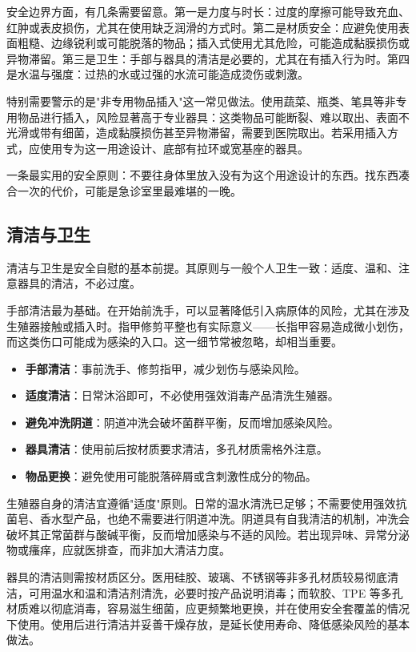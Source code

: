 \documentclass[12pt,UTF8]{ctexbook}
\newcommand{\keyword}[1]{\textbf{#1}}
\begin{document}
安全边界方面，有几条需要留意。第一是力度与时长：过度的摩擦可能导致充血、红肿或表皮损伤，尤其在使用缺乏润滑的方式时。第二是材质安全：应避免使用表面粗糙、边缘锐利或可能脱落的物品；插入式使用尤其危险，可能造成黏膜损伤或异物滞留。第三是卫生：手部与器具的清洁是必要的，尤其在有插入行为时。第四是水温与强度：过热的水或过强的水流可能造成烫伤或刺激。

特别需要警示的是"非专用物品插入"这一常见做法。使用蔬菜、瓶类、笔具等非专用物品进行插入，风险显著高于专业器具：这类物品可能断裂、难以取出、表面不光滑或带有细菌，造成黏膜损伤甚至异物滞留，需要到医院取出。若采用插入方式，应使用专为这一用途设计、底部有拉环或宽基座的器具。

\begin{tcolorbox}[colback=pink!5!white,colframe=red!50!black,title=贴心小叮咛]
	一条最实用的安全原则：不要往身体里放入没有为这个用途设计的东西。找东西凑合一次的代价，可能是急诊室里最难堪的一晚。
\end{tcolorbox}
\subsection{清洁与卫生}

清洁与卫生是安全自慰的基本前提。其原则与一般个人卫生一致：适度、温和、注意器具的清洁，不必过度。

手部清洁最为基础。在开始前洗手，可以显著降低引入病原体的风险，尤其在涉及生殖器接触或插入时。指甲修剪平整也有实际意义——长指甲容易造成微小划伤，而这类伤口可能成为感染的入口。这一细节常被忽略，却相当重要。

\begin{itemize}
	\item \keyword{手部清洁}：事前洗手、修剪指甲，减少划伤与感染风险。
	\item \keyword{适度清洁}：日常沐浴即可，不必使用强效消毒产品清洗生殖器。
	\item \keyword{避免冲洗阴道}：阴道冲洗会破坏菌群平衡，反而增加感染风险。
	\item \keyword{器具清洁}：使用前后按材质要求清洁，多孔材质需格外注意。
	\item \keyword{物品更换}：避免使用可能脱落碎屑或含刺激性成分的物品。
\end{itemize}

生殖器自身的清洁宜遵循"适度"原则。日常的温水清洗已足够；不需要使用强效抗菌皂、香水型产品，也绝不需要进行阴道冲洗。阴道具有自我清洁的机制，冲洗会破坏其正常菌群与酸碱平衡，反而增加感染与不适的风险。若出现异味、异常分泌物或瘙痒，应就医排查，而非加大清洁力度。

器具的清洁则需按材质区分。医用硅胶、玻璃、不锈钢等非多孔材质较易彻底清洁，可用温水和温和清洁剂清洗，必要时按产品说明消毒；而软胶、TPE 等多孔材质难以彻底消毒，容易滋生细菌，应更频繁地更换，并在使用安全套覆盖的情况下使用。使用后进行清洁并妥善干燥存放，是延长使用寿命、降低感染风险的基本做法。
\end{document}
